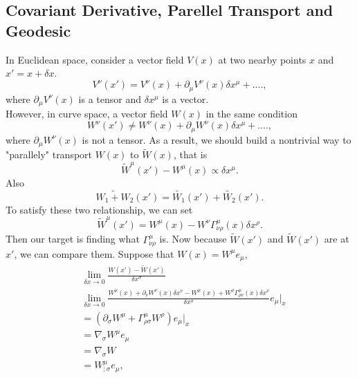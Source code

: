 \documentclass[openany,10pt]{book}
\theoremstyle{definition}
\theoremstyle{definition}
\theoremstyle{remark}
\begin{document}
\subsection{Covariant Derivative, Parellel Transport and Geodesic}
In Euclidean space, consider a vector field $V(x)$ at two nearby points $x$ and $x'=x+\delta x$.
\begin{equation}
    V^\nu(x')=V^\nu(x)+\partial_\mu V^\nu(x)\delta x^\mu+....,
\end{equation}
where $\partial_\mu V^\nu(x)$ is a tensor and $\delta x^\mu$ is a vector.\\
However, in curve space, a vector field $W(x)$ in the same condition 
\begin{equation}
    W^\nu(x')\neq W^\nu(x)+\partial_\mu W^\nu(x)\delta x^\mu+....,
\end{equation}
where $\partial_\mu W^\nu(x)$ is not a tensor. As a result, we should build a nontrivial way to "parallely" transport $W(x)$ to $\tilde{W}(x)$, that is 
\begin{equation}
    \tilde{W}^\mu(x')-W^\mu(x)\propto\delta x^\mu.
\end{equation}
Also 
\begin{equation}
    \widetilde{W_1+W_2}(x')=\tilde{W_1}(x')+\tilde{W_2}(x').
\end{equation}
To satisfy these two relationship, we can set 
\begin{equation}
    \tilde{W}^\mu(x')=W^\mu(x)-W^\nu\Gamma^\mu_{\nu\rho}(x)\delta x^\rho.
\end{equation}
Then our target is finding what $\Gamma^\mu_{\nu\rho}$ is. Now because $\tilde{W}(x')$ and $\tilde{W}(x')$ are at $x'$, we can compare them. Suppose that $W(x)=W^\mu e_\mu$, 
\begin{equation}
    \begin{aligned}
        &\lim_{\delta x\to0}\frac{W(x')-\tilde{W}(x')}{\delta x^\sigma}\\
        &\lim_{\delta x\to0}\frac{W^\mu(x)+\partial_\nu W^\nu(x)\delta x^\nu-W^\mu(x)+W^\rho\Gamma^\mu_{\rho\nu}(x)\delta x^\nu}{\delta x^\sigma}e_\mu|_x\\
        &=(\partial_\sigma W^\mu+\Gamma^\mu_{\rho\sigma} W^\rho)e_\mu|_x\\
        &=\nabla_\sigma W^\mu e_\mu\\
        &=\nabla_\sigma W\\
        &=W^\mu_{;\sigma}e_\mu,
    \end{aligned}
\end{equation}
\end{document}
